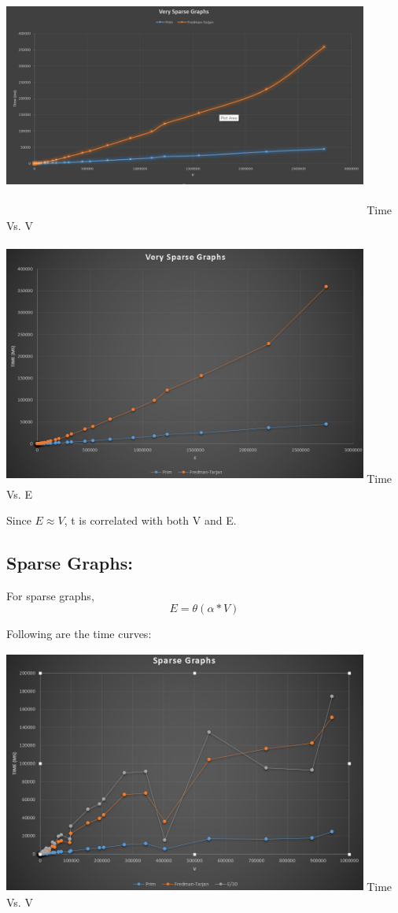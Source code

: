 \documentclass[]{article}
\begin{document}
\begin{center}
	\includegraphics[width=12cm, height=8cm]{VerySparse_V.png}
	Time Vs. V
\end{center}


\begin{center}
	\includegraphics[width=12cm, height=8cm]{VerySparse_E.png}
	Time Vs. E
\end{center}

	Since $ E \approx V $, t is correlated with both V and E. 
			

\subsection{Sparse Graphs:}
For sparse graphs, \[ E = \theta(\alpha*V)\]
	
	Following are the time curves:


\begin{center}
	\includegraphics[width=12cm, height=8cm]{Sparse_V.png}
	Time Vs. V
\end{center}
\end{document}

